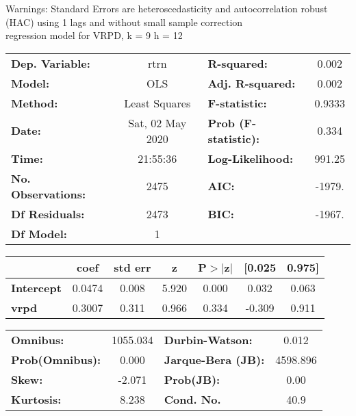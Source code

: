 Warnings: \newline
 [1] Standard Errors are heteroscedasticity and autocorrelation robust (HAC) using 1 lags and without small sample correction\\ 

regression model for VRPD, k = 9 h = 12\begin{center}
\begin{tabular}{lclc}
\toprule
\textbf{Dep. Variable:}    &       rtrn       & \textbf{  R-squared:         } &     0.002   \\
\textbf{Model:}            &       OLS        & \textbf{  Adj. R-squared:    } &     0.002   \\
\textbf{Method:}           &  Least Squares   & \textbf{  F-statistic:       } &    0.9333   \\
\textbf{Date:}             & Sat, 02 May 2020 & \textbf{  Prob (F-statistic):} &    0.334    \\
\textbf{Time:}             &     21:55:36     & \textbf{  Log-Likelihood:    } &    991.25   \\
\textbf{No. Observations:} &        2475      & \textbf{  AIC:               } &    -1979.   \\
\textbf{Df Residuals:}     &        2473      & \textbf{  BIC:               } &    -1967.   \\
\textbf{Df Model:}         &           1      & \textbf{                     } &             \\
\bottomrule
\end{tabular}
\begin{tabular}{lcccccc}
                   & \textbf{coef} & \textbf{std err} & \textbf{z} & \textbf{P$> |$z$|$} & \textbf{[0.025} & \textbf{0.975]}  \\
\midrule
\textbf{Intercept} &       0.0474  &        0.008     &     5.920  &         0.000        &        0.032    &        0.063     \\
\textbf{vrpd}      &       0.3007  &        0.311     &     0.966  &         0.334        &       -0.309    &        0.911     \\
\bottomrule
\end{tabular}
\begin{tabular}{lclc}
\textbf{Omnibus:}       & 1055.034 & \textbf{  Durbin-Watson:     } &    0.012  \\
\textbf{Prob(Omnibus):} &   0.000  & \textbf{  Jarque-Bera (JB):  } & 4598.896  \\
\textbf{Skew:}          &  -2.071  & \textbf{  Prob(JB):          } &     0.00  \\
\textbf{Kurtosis:}      &   8.238  & \textbf{  Cond. No.          } &     40.9  \\
\bottomrule
\end{tabular}
\end{center}

